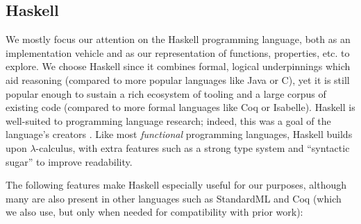 \subsection{Haskell}
\label{sec:haskell}

We mostly focus our attention on the Haskell programming language, both as an
implementation vehicle and as our representation of functions, properties, etc.
to explore. We choose Haskell since it combines formal, logical underpinnings
which aid reasoning (compared to more popular languages like Java or C), yet it
is still popular enough to sustain a rich ecosystem of tooling and a large
corpus of existing code (compared to more formal languages like Coq or
Isabelle). Haskell is well-suited to programming language research; indeed, this
was a goal of the language's creators \cite{marlow2010haskell}. Like most
\emph{functional} programming languages, Haskell builds upon $\lambda$-calculus,
with extra features such as a strong type system and ``syntactic sugar'' to
improve readability.

The following features make Haskell especially useful for our purposes, although
many are also present in other languages such as StandardML and Coq (which we
also use, but only when needed for compatibility with prior work):

